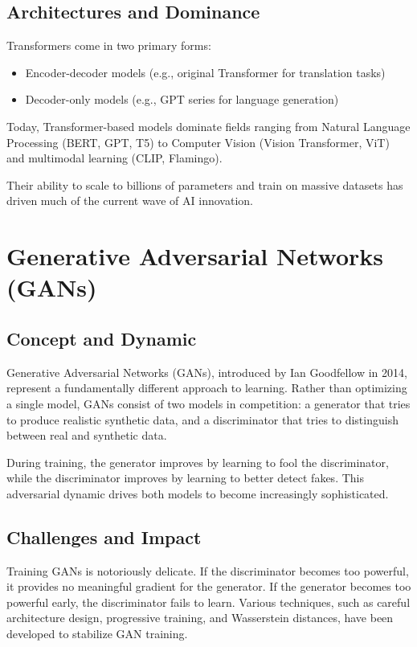 \documentclass[openany]{book}
\begin{document}
\subsection{Architectures and Dominance}

Transformers come in two primary forms:

\begin{itemize}
    \item Encoder-decoder models (e.g., original Transformer for translation 
    tasks)
    \item Decoder-only models (e.g., GPT series for language generation)
\end{itemize}

Today, Transformer-based models dominate fields ranging from Natural Language 
Processing (BERT, GPT, T5) to Computer Vision (Vision Transformer, ViT) and 
multimodal learning (CLIP, Flamingo).

Their ability to scale to billions of parameters and train on massive datasets 
has driven much of the current wave of AI innovation.

\section{Generative Adversarial Networks (GANs)}

\subsection{Concept and Dynamic}

Generative Adversarial Networks (GANs), introduced by Ian Goodfellow in 2014, 
represent a fundamentally different approach to learning. Rather than optimizing 
a single model, GANs consist of two models in competition: a generator that 
tries to produce realistic synthetic data, and a discriminator that tries to 
distinguish between real and synthetic data.

During training, the generator improves by learning to fool the discriminator, 
while the discriminator improves by learning to better detect fakes. This 
adversarial dynamic drives both models to become increasingly sophisticated.

\subsection{Challenges and Impact}

Training GANs is notoriously delicate. If the discriminator becomes too 
powerful, it provides no meaningful gradient for the generator. If the generator 
becomes too powerful early, the discriminator fails to learn. Various 
techniques, such as careful architecture design, progressive training, and 
Wasserstein distances, have been developed to stabilize GAN training.
\end{document}
